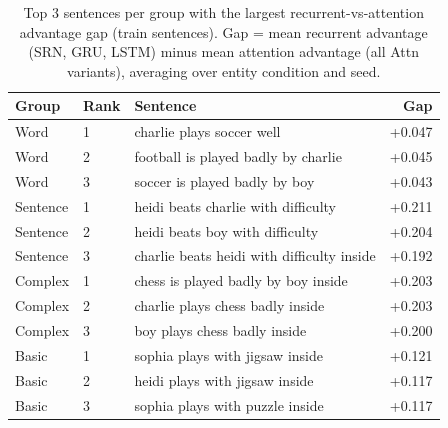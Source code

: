 \begin{table}[t]
\centering\scriptsize
\begin{tabular}{@{}lllr@{}}
\toprule
\textbf{Group} & \textbf{Rank} & \textbf{Sentence} & \textbf{Gap} \\
\midrule
Word & 1 & charlie plays soccer well & +0.047 \\
Word & 2 & football is played badly by charlie & +0.045 \\
Word & 3 & soccer is played badly by boy & +0.043 \\
Sentence & 1 & heidi beats charlie with difficulty & +0.211 \\
Sentence & 2 & heidi beats boy with difficulty & +0.204 \\
Sentence & 3 & charlie beats heidi with difficulty inside & +0.192 \\
Complex & 1 & chess is played badly by boy inside & +0.203 \\
Complex & 2 & charlie plays chess badly inside & +0.203 \\
Complex & 3 & boy plays chess badly inside & +0.200 \\
Basic & 1 & sophia plays with jigsaw inside & +0.121 \\
Basic & 2 & heidi plays with jigsaw inside & +0.117 \\
Basic & 3 & sophia plays with puzzle inside & +0.117 \\
\bottomrule
\end{tabular}
\caption{\small Top 3 sentences per group with the largest recurrent-vs-attention advantage gap (train sentences). Gap = mean recurrent advantage (SRN, GRU, LSTM) minus mean attention advantage (all Attn variants), averaging over entity condition and seed.}
\label{tab:train_sentence_arch_gap_compact}
\end{table}
